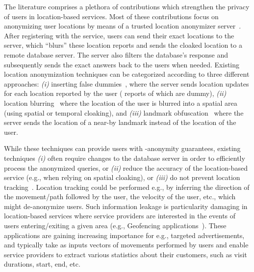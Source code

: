 \documentclass{llncs}
\begin{document}
The literature comprises a plethora of contributions which strengthen the privacy of users in location-based services. Most of these contributions focus on anonymizing user locations by means of a trusted
 location anonymizer server~\cite{Bamba:2008:SAL:1367497.1367531,Gruteser:2003:AUL:1066116.1189037,Kalnis:2007:PLI:1313047.1313203,Mokbel:2006:NCQ:1182635.1164193,Yiu:2010:ESS:1825238.1825264}. After registering with the service, users can send their exact locations to the server, which ``blurs'' these location reports and sends the cloaked location to a remote database server.
 The server also filters the database's response and subsequently sends the exact answers back to the users when needed. Existing location anonymization techniques can be categorized according to three different approaches: \emph{(i)} inserting false dummies~\cite{Kido05ananonymous}, where
 the server sends  location updates for each location reported by the user ( reports of which are dummy), \emph{(ii)} location blurring~\cite{Chow:2007:EPC:1784462.1784477,Bamba:2008:SAL:1367497.1367531,Gruteser:2003:AUL:1066116.1189037,Kalnis:2007:PLI:1313047.1313203,DBLP:conf/infocom/WangXHZLX12} where the location of the user is blurred into a
 spatial area (using spatial or temporal cloaking), and \emph{(iii)} landmark obfuscation~\cite{Hong:2004:APU:990064.990087} where the server sends the location of a near-by landmark instead of the location of the user.

 While these techniques can provide users with -anonymity guarantees, existing techniques \emph{(i)} often require changes to the database server in order to efficiently process
 the anonymized queries, or \emph{(ii)} reduce the accuracy of the location-based service (e.g., when relying on spatial cloaking), or \emph{(iii)} do not prevent location tracking~\cite{Mokbel:2006:NCQ:1182635.1164193}. Location tracking
 could be performed e.g., by inferring the direction of the movement/path followed by the user, the velocity of
 the user, etc., which might de-anonymize users. Such information leakage is particularity damaging in location-based services where service providers are interested in the events of users entering/exiting
 a given area (e.g., Geofencing applications~\cite{Sheth:2009:GCW:1560004.1560029,geofencing,geofencing1,Shekhar:1999:SDR:627320.627970,Myllymaki:2003:HSI:775152.775168}). These applications are gaining increasing importance
 for e.g., targeted advertisements, and typically take as inputs
 vectors of movements
 performed by users and enable service
 providers to extract various statistics about their customers, such as visit durations, start, end, etc.
\end{document}
